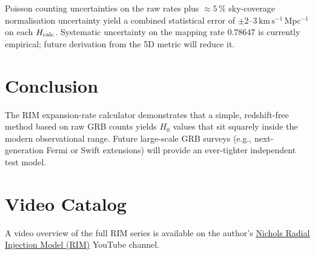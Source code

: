 \documentclass[12pt]{article}
\begin{document}
Poisson counting uncertainties on the raw rates plus \(\approx 5\,\%\) sky-coverage normalisation uncertainty yield a combined statistical error of \(\pm 2\)--\(3\,\mathrm{km\,s^{-1}\,Mpc^{-1}}\) on each \(H_{\rm calc}\). Systematic uncertainty on the mapping rate \(0.78647\) is currently empirical; future derivation from the 5D metric will reduce it.

\section{Conclusion}

The RIM expansion-rate calculator demonstrates that a simple, redshift-free method based on raw GRB counts yields \(H_0\) values that sit squarely inside the modern observational range. Future large-scale GRB surveys (e.g., next-generation Fermi or Swift extensions) will provide an ever-tighter independent test model.

\section{Video Catalog}
A video overview of the full RIM series is available on the author's \href{https://www.youtube.com/@Nichols_Radial_Injection_Model}{Nichols Radial Injection Model (RIM)} YouTube channel.
\end{document}
